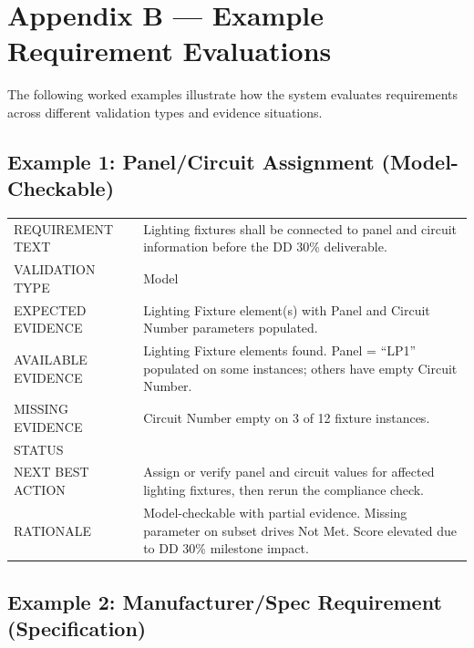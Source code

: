 \documentclass[10pt,letterpaper]{article}
\newcommand{\smalllabel}[1]{{\scriptsize\textcolor{emaMuted}{\MakeUppercase{#1}}}}
\newcommand{\badge}[3]{\tcbox[on line,colback=#2,colframe=#2,boxrule=0pt,
    arc=2mm,left=5pt,right=5pt,top=2pt,bottom=2pt]{\scriptsize\textbf{\textcolor{#3}{#1}}}}
\newcommand{\notmetbadge}{\badge{Not Met}{emaRedBg}{emaRed}}
\begin{document}
\clearpage
\section{Appendix B --- Example Requirement Evaluations}

The following worked examples illustrate how the system evaluates requirements across different
validation types and evidence situations.

\subsection*{Example 1: Panel/Circuit Assignment (Model-Checkable)}

\begin{tcolorbox}[colback=white]
\begin{tabularx}{\textwidth}{p{1.4in}p{4.8in}}
\toprule
\smalllabel{Requirement Text} & Lighting fixtures shall be connected to panel and circuit
  information before the DD 30\% deliverable. \\
\smalllabel{Validation Type} & Model \\
\smalllabel{Expected Evidence} & Lighting Fixture element(s) with Panel and Circuit Number
  parameters populated. \\
\smalllabel{Available Evidence} & Lighting Fixture elements found. Panel = ``LP1'' populated on
  some instances; others have empty Circuit Number. \\
\smalllabel{Missing Evidence} & Circuit Number empty on 3 of 12 fixture instances. \\
\smalllabel{Status} & \notmetbadge \\
\smalllabel{Next Best Action} & Assign or verify panel and circuit values for affected lighting
  fixtures, then rerun the compliance check. \\
\smalllabel{Rationale} & Model-checkable with partial evidence. Missing parameter on subset drives
  Not Met. Score elevated due to DD 30\% milestone impact. \\
\bottomrule
\end{tabularx}
\end{tcolorbox}

\subsection*{Example 2: Manufacturer/Spec Requirement (Specification)}
\end{document}
